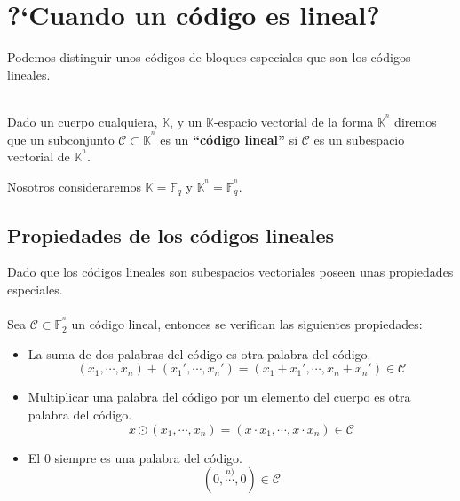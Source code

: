 %
%

%
\newpage
%
\section{?`Cuando un c\'odigo es lineal?}

Podemos distinguir unos c\'odigos de bloques especiales que son los c\'odigos
lineales.
\begin{definicion}
\ \\
Dado un cuerpo cualquiera, $\mathbb{K}$, y un $\mathbb{K}$-espacio vectorial de
la forma $\mathbb{K}^{^n}$ diremos que un subconjunto $\mathcal{C}\subset
\mathbb{K}^{^n}$ es un \textbf{``c\'odigo lineal''} si $\mathcal{C}$ es un
subespacio vectorial de $\mathbb{K}^{^n}$.
\end{definicion}
Nosotros consideraremos $\mathbb{K}=\mathbb{F}_q$ y
$\mathbb{K}^{^n}=\mathbb{F}^{^n}_q$.

\subsection{Propiedades de los c\'odigos lineales}

Dado que los c\'odigos lineales son subespacios vectoriales poseen unas
propiedades especiales.\\ \\ 
%
Sea $\mathcal{C}\subset \mathbb{F}^{^n}_2$ un c\'odigo lineal, entonces se
verifican las siguientes propiedades:
\begin{itemize}
\item La suma de dos palabras del c\'odigo es otra palabra del c\'odigo.
\begin{displaymath}
(x_1,\cdots,x_n)+(x_1',\cdots,x_n') = (x_1+x_1',\cdots,x_n+x_n')\in \mathcal{C}
\end{displaymath}
\item Multiplicar una palabra del c\'odigo por un elemento del cuerpo es otra
palabra del c\'odigo.
\begin{displaymath}
x\odot (x_1,\cdots,x_n) = (x\cdot x_1,\cdots, x\cdot x_n)\in \mathcal{C}
\end{displaymath}
\item El $0$ siempre es una palabra del c\'odigo.
\begin{displaymath}
(0,\stackrel{n)}\cdots,0)\in \mathcal{C}
\end{displaymath}
\end{itemize}
